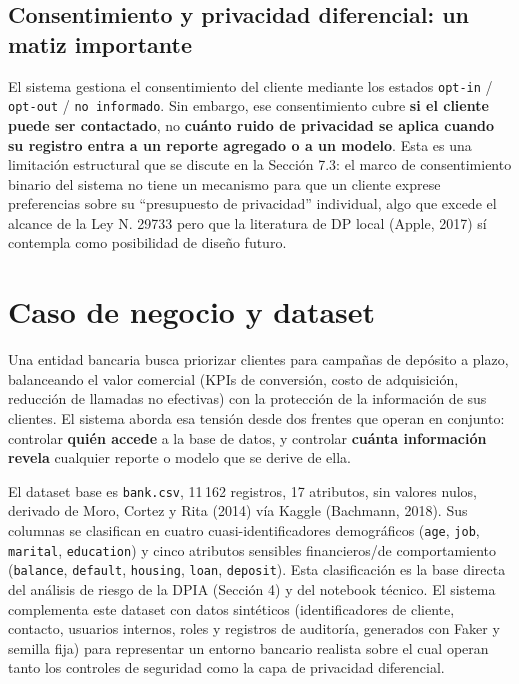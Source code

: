 \documentclass[11pt,a4paper]{article}
\begin{document}
\subsection{Consentimiento y privacidad diferencial: un matiz importante}

El sistema gestiona el consentimiento del cliente mediante los estados \texttt{opt-in} /
\texttt{opt-out} / \texttt{no informado}. Sin embargo, ese consentimiento cubre \textbf{si el
cliente puede ser contactado}, no \textbf{cuánto ruido de privacidad se aplica cuando su registro
entra a un reporte agregado o a un modelo}. Esta es una limitación estructural que se discute en
la Sección 7.3: el marco de consentimiento binario del sistema no tiene un mecanismo para que un
cliente exprese preferencias sobre su ``presupuesto de privacidad'' individual, algo que excede el
alcance de la Ley N.\textdegree{} 29733 pero que la literatura de DP local (Apple, 2017) sí
contempla como posibilidad de diseño futuro.

\section{Caso de negocio y dataset}

Una entidad bancaria busca priorizar clientes para campañas de depósito a plazo, balanceando el
valor comercial (KPIs de conversión, costo de adquisición, reducción de llamadas no efectivas) con
la protección de la información de sus clientes. El sistema aborda esa tensión desde dos frentes
que operan en conjunto: controlar \textbf{quién accede} a la base de datos, y controlar
\textbf{cuánta información revela} cualquier reporte o modelo que se derive de ella.

El dataset base es \texttt{bank.csv}, 11\,162 registros, 17 atributos, sin valores nulos,
derivado de Moro, Cortez y Rita (2014) vía Kaggle (Bachmann, 2018). Sus columnas se clasifican en
cuatro cuasi-identificadores demográficos (\texttt{age}, \texttt{job}, \texttt{marital},
\texttt{education}) y cinco atributos sensibles financieros/de comportamiento (\texttt{balance},
\texttt{default}, \texttt{housing}, \texttt{loan}, \texttt{deposit}). Esta clasificación es la
base directa del análisis de riesgo de la DPIA (Sección 4) y del notebook técnico. El sistema
complementa este dataset con datos sintéticos (identificadores de cliente, contacto, usuarios
internos, roles y registros de auditoría, generados con Faker y semilla fija) para representar un
entorno bancario realista sobre el cual operan tanto los controles de seguridad como la capa de
privacidad diferencial.
\end{document}
